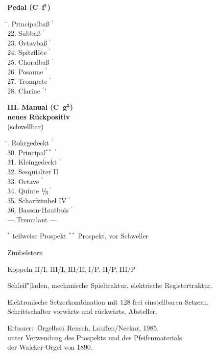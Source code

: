 \documentclass[a4paper,12pt,halfparskip]{scrartcl}
\newcommand{\Fuss}{$^\prime$}
\newcommand{\bruch}[2]{$\raisebox{2pt}{\footnotesize#1}\hspace{-2pt}/\hspace{-1.5pt}\raisebox{-2pt}{\footnotesize#2}$}
\newcommand{\ed}{\bruch{1}{3}$\,$}
\begin{document}
\begin{minipage}[t]{.45\textwidth}
{\bfseries Pedal (C--f$^{\mathbf1}$)}
\begin{tabbing}
\hspace{5cm}\= . Principalbaß \Fuss\' \\
22. Subbaß \Fuss\' \\
23. Octavbaß \Fuss\' \\
24. Spitzflöte \Fuss\' \\
25. Choralbaß \Fuss\' \\
26. Posaune \Fuss\' \\
27. Trompete \Fuss\' \\
28. Clarine \Fuss\'
\end{tabbing}

\vspace{\baselineskip}

{\bfseries III. Manual (C--g$^{\mathbf3}$)} \\
\phantom{\bfseries III.} {\bfseries neues Rückpositiv} \\
\phantom{\bfseries III.} (schwellbar)
\begin{tabbing}
\hspace{5cm}\= . Rohrgedeckt \Fuss\' \\
30. Principal$^{**}$ \Fuss\' \\
31. Kleingedeckt \Fuss\' \\
32. Sesquialter II \\
33. Octave \Fuss\' \\
34. Quinte  \ed\Fuss\' \\
35. Scharfzimbel IV \Fuss\' \\
36. Basson-Hautbois \Fuss\' \\
--- Tremulant ---
\end{tabbing}
\end{minipage}

\medskip

{\footnotesize
\hspace{57mm}
$^*$ teilweise Prospekt
\hspace{5mm}
$^{**}$ Prospekt, vor Schweller
}

\vfill

Zimbelstern

\smallskip

Koppeln   II/I, III/I, III/II, I/P, II/P, III/P

\smallskip

Schleif"|laden, mechanische Spieltraktur, elektrische Registertraktur.

\smallskip

Elektronische Setzerkombination mit 128 frei einstellbaren Setzern, \\
Schrittschalter vorwärts und rückwärts, Absteller.

\vfill

\begin{tabbing}
Erbauer: $\:$\=Orgelbau Rensch, Lauffen/Neckar, 1985, \\
 \>unter Verwendung des Prospekts und des Pfeifenmaterials \\
 \>der Walcker-Orgel von 1890.
\end{tabbing}
\end{document}
